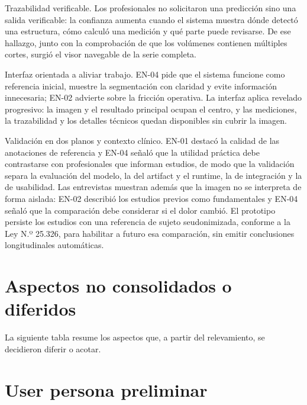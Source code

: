 Trazabilidad verificable. Los profesionales no solicitaron una predicción sino una salida verificable: la confianza aumenta cuando el sistema muestra dónde detectó una estructura, cómo calculó una medición y qué parte puede revisarse. De ese hallazgo, junto con la comprobación de que los volúmenes contienen múltiples cortes, surgió el visor navegable de la serie completa.

Interfaz orientada a aliviar trabajo. EN-04 pide que el sistema funcione como referencia inicial, muestre la segmentación con claridad y evite información innecesaria; EN-02 advierte sobre la fricción operativa. La interfaz aplica revelado progresivo: la imagen y el resultado principal ocupan el centro, y las mediciones, la trazabilidad y los detalles técnicos quedan disponibles sin cubrir la imagen.

Validación en dos planos y contexto clínico. EN-01 destacó la calidad de las anotaciones de referencia y EN-04 señaló que la utilidad práctica debe contrastarse con profesionales que informan estudios, de modo que la validación separa la evaluación del modelo, la del artifact y el runtime, la de integración y la de usabilidad. Las entrevistas muestran además que la imagen no se interpreta de forma aislada: EN-02 describió los estudios previos como fundamentales y EN-04 señaló que la comparación debe considerar si el dolor cambió. El prototipo persiste los estudios con una referencia de sujeto seudonimizada, conforme a la Ley N.º 25.326, para habilitar a futuro esa comparación, sin emitir conclusiones longitudinales automáticas.

\section{Aspectos no consolidados o diferidos}

La siguiente tabla resume los aspectos que, a partir del relevamiento, se decidieron diferir o acotar.


\section{User persona preliminar}

